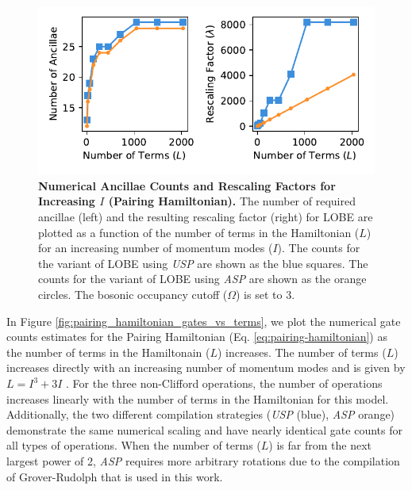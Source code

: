 \begin{figure}
    \centering
    \includegraphics[width=12cm]{figures/pairing_hamiltonian_qubits_and_rescaling_vs_terms.pdf}
    \caption{
        \textbf{Numerical Ancillae Counts and Rescaling Factors for Increasing $I$ (Pairing Hamiltonian).}
        The number of required ancillae (left) and the resulting rescaling factor (right) for LOBE are plotted as a function of the number of terms in the Hamiltonian ($L$) for an increasing number of momentum modes ($I$).
        The counts for the variant of LOBE using \textit{USP} are shown as the blue squares.
        The counts for the variant of LOBE using \textit{ASP} are shown as the orange circles.
        The bosonic occupancy cutoff ($\Omega$) is set to $3$.
    }
    \label{fig:pairing_hamiltonian_qubits_and_rescaling_vs_terms}
\end{figure}

In Figure \ref{fig:pairing_hamiltonian_gates_vs_terms}, we plot the numerical gate counts estimates for the Pairing Hamiltonian (Eq. \ref{eq:pairing-hamiltonian}) as the number of terms in the Hamiltonain ($L$) increases.
The number of terms ($L$) increases directly with an increasing number of momentum modes and is given by $L = I^3 + 3I$ .
For the three non-Clifford operations, the number of operations increases linearly with the number of terms in the Hamiltonian for this model.
Additionally, the two different compilation strategies (\textit{USP} (blue), \textit{ASP} orange) demonstrate the same numerical scaling and have nearly identical gate counts for all types of operations.
When the number of terms ($L$) is far from the next largest power of 2, \textit{ASP} requires more arbitrary rotations due to the compilation of Grover-Rudolph that is used in this work.


